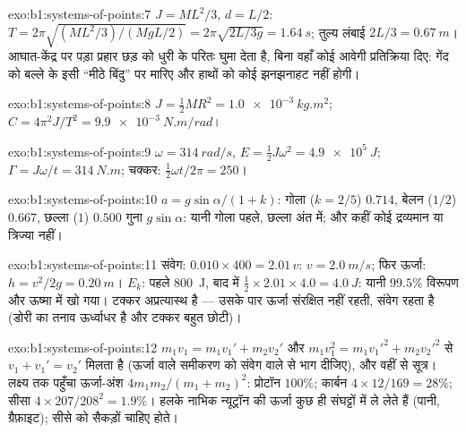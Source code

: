 \begin{solution}{exo:b1:systems-of-points:7}
$J = ML^2/3$, $d = L/2$: $T = 2\pi\sqrt{(ML^2/3)/(MgL/2)} = 2\pi\sqrt{2L/3g}
= \qty{1.64}{s}$; तुल्य लंबाई $2L/3 = \qty{0.67}{m}$। आघात-केंद्र पर पड़ा
प्रहार छड़ को धुरी के परितः घुमा देता है, बिना वहाँ कोई आवेगी प्रतिक्रिया
दिए: गेंद को बल्ले के इसी ``मीठे बिंदु'' पर मारिए और हाथों को कोई झनझनाहट
नहीं होगी।
\end{solution}

\begin{solution}{exo:b1:systems-of-points:8}
$J = \tfrac12 MR^2 = \qty{1.0e-3}{kg.m^2}$; $C = 4\pi^2J/T^2 = \qty{9.9e-3}{N.m/rad}$।
\end{solution}

\begin{solution}{exo:b1:systems-of-points:9}
$\omega = \qty{314}{rad/s}$, $E = \tfrac12 J\omega^2 = \qty{4.9e5}{J}$;
$\Gamma = J\omega/t = \qty{314}{N.m}$; चक्कर: $\tfrac12\omega t/2\pi = 250$।
\end{solution}

\begin{solution}{exo:b1:systems-of-points:10}
$a = g\sin\alpha/(1 + k)$: गोला ($k = 2/5$) $0.714$, बेलन ($1/2$)
$0.667$, छल्ला ($1$) $0.500$ गुना $g\sin\alpha$: यानी गोला पहले, छल्ला अंत में;
और कहीं कोई द्रव्यमान या त्रिज्या नहीं।
\end{solution}

\begin{solution}{exo:b1:systems-of-points:11}
संवेग: $0.010 \times 400 = 2.01\,v$: $v = \qty{2.0}{m/s}$; फिर ऊर्जा:
$h = v^2/2g = \qty{0.20}{m}$। $E_k$: पहले \qty{800}{J}, बाद में $\tfrac12 \times
2.01 \times 4.0 = \qty{4.0}{J}$: यानी $99.5\%$ विरूपण और ऊष्मा में खो गया।
टक्कर अप्रत्यास्थ है --- उसके पार ऊर्जा संरक्षित नहीं रहती, संवेग रहता है
(डोरी का तनाव ऊर्ध्वाधर है और टक्कर बहुत छोटी)।
\end{solution}

\begin{solution}{exo:b1:systems-of-points:12}
$m_1v_1 = m_1v_1' + m_2v_2'$ और $m_1v_1^2 = m_1v_1'^2 + m_2v_2'^2$ से
$v_1 + v_1' = v_2'$ मिलता है (ऊर्जा वाले समीकरण को संवेग वाले से भाग
दीजिए), और वहीं से सूत्र। लक्ष्य तक पहुँचा ऊर्जा-अंश $4m_1m_2/(m_1 + m_2)^2$:
प्रोटॉन $100\%$; कार्बन $4 \times 12/169 = 28\%$; सीसा $4 \times 207/208^2 =
1.9\%$। हलके नाभिक न्यूट्रॉन की ऊर्जा कुछ ही संघट्टों में ले लेते हैं
(पानी, ग्रैफ़ाइट); सीसे को सैकड़ों चाहिए होते।
\end{solution}

